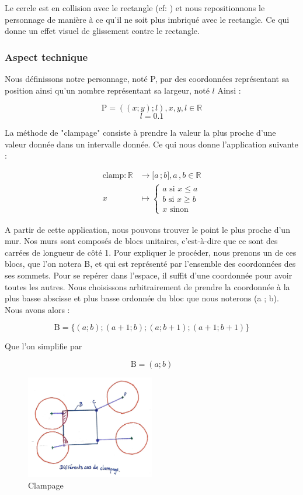 \documentclass[11pt]{article}
\begin{document}
Le cercle est en collision avec le rectangle (cf: ) et nous repositionnons le personnage de manière à ce qu'il ne soit plus imbriqué avec le rectangle. 
Ce qui donne un effet visuel de glissement contre le rectangle.

\subsubsection{Aspect technique}

Nous définissons notre personnage, noté P, par des coordonnées représentant sa position ainsi qu'un nombre représentant sa largeur, noté $l$ Ainsi :

$$\text{P} = ((x ; y) ; l), x, y, l \in \mathbb{R}$$ 
$$l = 0.1$$

La méthode de "clampage" consiste à prendre la valeur la plus proche d'une valeur donnée dans un intervalle donnée.
Ce qui nous donne l'applica\-tion suivante :

\begin{align*}
    \text{clamp}\colon\mathbb{R}&\longrightarrow \mathopen{[}a\,;b\mathclose{]}, a\,, b \in \mathbb{R}\\
    x&\longmapsto  \left \{ \begin{array}{c} a \text{ si } x \leq a \\ b \text{ si } x \geq b \\ x \text{ sinon} \end{array} \right.
\end{align*}

A partir de cette application, nous pouvons trouver le point le plus proche 
d'un mur. Nos murs sont composés de blocs unitaires, c'est-à-dire que ce 
sont des carrées de longueur de côté 1. Pour expliquer le procéder, nous 
prenons un de ces blocs, que l'on notera B, et qui est représenté par 
l'ensemble des coordonnées des ses sommets. Pour se repérer dans l'espace, 
il suffit d'une coordonnée pour avoir toutes les autres. Nous choisissons 
arbitrairement de prendre la coordonnée à la plus basse abscisse et plus 
basse ordonnée du bloc que nous noterons (a ; b). Nous avons alors :


$$\text{B} = \{(a ; b) ; (a + 1 ; b) ; (a ; b + 1) ; (a + 1 ; b + 1)\}$$

Que l'on simplifie par

$$\text{B} = (a ; b)$$

\begin{figure}
	\centering
	\includegraphics[width=0.5\textwidth]{image/fig4.jpg}
	\caption{Clampage}
	\label{fig:clampage}
\end{figure}
\end{document}
